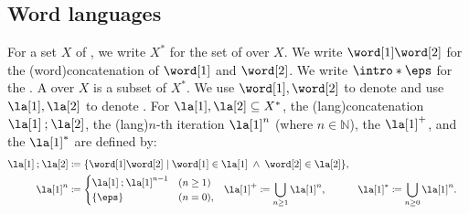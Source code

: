 \documentclass[a4paper,UKenglish,cleveref, autoref, thm-restate]{lipics-v2021}
\DeclarePairedDelimiter\set{\{}{\}}
\newcommand{\defeq}{\coloneq}
\newcommand{\nat}{\mathbb{N}}
\newcommand{\compo}{\mathbin{;}}
\begin{document}
\subsection{Word languages}
%
\AP
For a set $X$ of \intro*{}, we write $X^{*}$ for the set of \intro*{} over $X$.
\AP
We write $\word[1] \word[2]$ for the \intro*\kl(word){concatenation} of  $\word[1]$ and $\word[2]$.
\AP
We write $\intro*\eps$ for the \intro*{}.
\AP
A \intro*{} over $X$ is a subset of $X^{*}$.
\AP
We use $\word[1], \word[2]$ to denote  and use $\la[1], \la[2]$ to denote .
\AP
For  $\la[1], \la[2] \subseteq X^{*}$, the \intro*\kl(lang){concatenation} $\la[1] \compo \la[2]$,
the \intro*\kl(lang){$n$-th iteration} $\la[1]^n$ (where $n \in \nat$),
the \intro*{} $\la[1]^{+}$, and
the \intro*{} $\la[1]^{*}$ are defined by:
\begin{align*}
    \la[1] \compo \la[2] & \defeq \set{\word[1] \word[2] \mid \word[1] \in \la[1] \;\land\; \word[2] \in \la[2]},\hspace{-.1em}                    \span\span    \\
    \la[1]^{n} & \defeq \begin{cases}
        \la[1] \compo \la[1]^{n-1} & (n \ge 1)\\
        \set{\eps} & (n = 0),
    \end{cases}\hspace{-.1em} & 
    \la[1]^{+}  & \defeq \bigcup_{n \ge 1} \la[1]^{n},\hspace{-.1em}&
    \la[1]^{*}  & \defeq \bigcup_{n \ge 0} \la[1]^{n}.
\end{align*}
\end{document}
